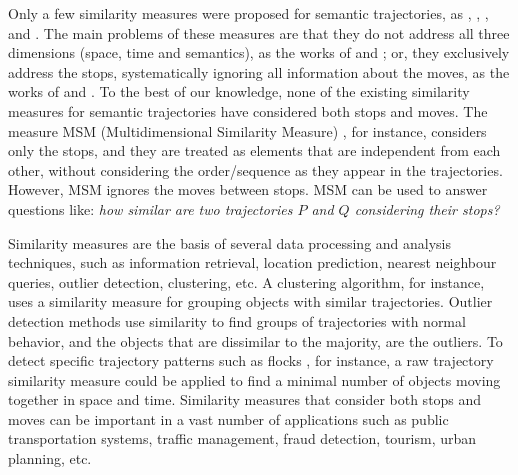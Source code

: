 \documentclass[12pt]{article}
\begin{document}
{Only a few  similarity measures were proposed for semantic trajectories, as } \cite{Kang:2009:SMT:1529282.1529580}, \cite{Liu:2012:SMM:2442968.2442971}, \cite{Ying:2010:MUS:1867699.1867703}, and \cite{Furtado:TGIS12156}{. The main problems of these measures are that they do not address all three dimensions (space, time and semantics), as the works of }\cite{Kang:2009:SMT:1529282.1529580} and \cite{Liu:2012:SMM:2442968.2442971}{; or, 
they exclusively address the stops, systematically ignoring all information about the moves, as the works of }\cite{Ying:2010:MUS:1867699.1867703} and \cite{Furtado:TGIS12156}{. To the best of our knowledge, none of the existing similarity measures for semantic trajectories have considered both stops and moves. The measure MSM (Multidimensional Similarity Measure) }\citep{Furtado:TGIS12156}{, for instance, considers only the stops, and they are treated as elements that are independent from each other, without considering the order/sequence as they appear in the trajectories. However, MSM ignores the moves between stops. MSM can be used to answer questions like: \emph{how similar are two trajectories $P$ and $Q$ considering their stops?}}

 

{Similarity measures are the basis of several data processing and analysis techniques, such as information retrieval, location prediction, nearest neighbour queries, outlier detection, clustering, etc. A clustering algorithm, for instance, uses a similarity measure for grouping objects with similar trajectories. Outlier detection methods use similarity to find groups of trajectories with normal behavior, and the objects that are dissimilar to the majority, are the outliers. To detect specific trajectory patterns such as flocks }\citep{Laube2005}{, for instance, a raw trajectory similarity measure could be applied to find a minimal number of objects moving together in space and time. Similarity measures that consider both stops and moves can be important in a vast number of applications such as public transportation systems, traffic management, fraud detection, tourism, urban planning, etc. }
\end{document}
